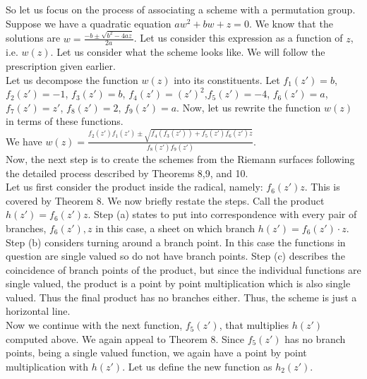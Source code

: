 So let us focus on the process of associating a scheme with a permutation group.  Suppose we have a quadratic equation $a w^{2}+b w + z=0$.  We know that the solutions are $w=\frac{-b \pm \sqrt{b^{2}-4az}}{2a}$.  Let us consider this expression as a function of $z$, i.e. $w\left(z\right)$.  Let us consider what the scheme looks like.  We will follow the prescription given earlier.\\

Let us decompose the function $w\left(z\right)$ into its constituents.  Let $f_{1}\left(z'\right)=b$, $f_{2}\left(z'\right)=-1$, $f_{3}\left(z'\right)=b$, $f_{4}\left(z'\right)=\left(z'\right)^{2}$,$f_{5}\left(z'\right)=-4$, $f_{6}\left(z'\right)=a$, $f_{7}\left(z'\right)=z'$, $f_{8}\left(z'\right)=2$, $f_{9}\left(z'\right)=a$.  Now, let us rewrite the function $w\left(z\right)$ in terms of these functions.\\

We have $w\left(z\right)=\frac{ f_{2}\left(z'\right) f_{1}\left(z'\right) \pm \sqrt{f_{4}\left(f_{3}\left(z'\right)\right)+f_{5}\left(z'\right)f_{6}\left(z'\right)z}} {f_{8}\left(z'\right) f_{9} \left(z' \right)}$.\\

Now, the next step is to create the schemes from the Riemann surfaces following the detailed process described by Theorems 8,9, and 10.\\

Let us first consider the product inside the radical, namely: $f_{6}\left(z'\right)z$.  This is covered by Theorem 8.  We now briefly restate the steps.  Call the product $h\left(z'\right)=f_{6}\left(z'\right)z$.  Step (a) states to put into correspondence with every pair of branches, $f_{6}\left(z'\right), z$ in this case, a sheet on which branch $h\left(z'\right)=f_{6} \left(z'\right) \cdot z$.  Step (b) considers turning around a branch point.  In this case the functions in question are single valued so do not have branch points.  Step (c) describes the coincidence of branch points of the product, but since the individual functions are single valued, the product is a point by point multiplication which is also single valued.  Thus the final product has no branches either.  Thus, the scheme is just a horizontal line.\\

Now we continue with the next function, $f_{5}\left(z'\right)$, that multiplies $h\left(z'\right)$ computed above.  We again appeal to Theorem 8.  Since $f_{5}\left(z'\right)$ has no branch points, being a single valued function, we again have a point by point multiplication with $h\left(z'\right)$.  Let us define the new function as $h_{2}\left(z'\right)$.\\


